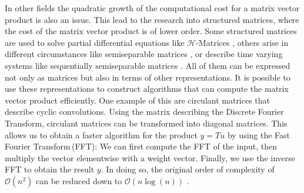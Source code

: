 \documentclass[numbers=noenddot,doctype=mastersthesis,BCOR=15mm,biblatex]{ldvbook}%
\newcommand{\bigO}{\mathscr{O}}
\begin{document}
In other fields the quadratic growth of the computational cost for a matrix vector product is also an issue.
This lead to the research into structured matrices, where the cost of the matrix vector product is of lower order.
Some structured matrices are used to solve partial differential equations like $\mathcal{H}$-Matrices \cite{grasedyck_theorie_2001}, others arise in different circumstances like semiseparable matrices \cite{vandebril_bibliography_2005}, 
or describe time varying systems like sequentially semiseparable matrices \cite{dewilde_time-varying_1998}.
All of them can be expressed not only as matrices but also in terms of other representations.
It is possible to use these representations to construct algorithms that can compute the matrix vector product efficiently.
One example of this are circulant matrices that describe cyclic convolutions.
Using the matrix describing the Discrete Fourier Transform, circulant matrices can be transformed into diagonal matrices.
This allows us to obtain a faster algorithm for the product $y=Tu$ by using the Fast Fourier Transform\,(FFT):
We can first compute the FFT of the input, then multiply the vector elementwise with a weight vector. Finally, we use the inverse FFT to obtain the result $y$.
In doing so, the original order of complexity of $\bigO(n^2)$ can be reduced down to $\bigO(n\log(n))$ \cite{strang_computational_2007}.
\end{document}
